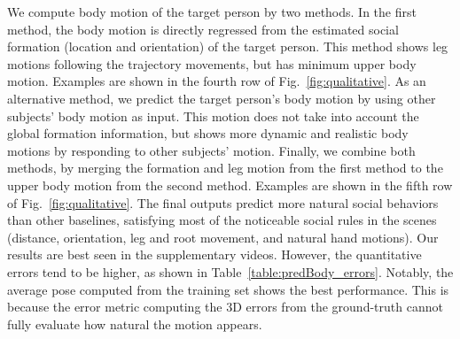 We compute body motion of the target person by two methods. In the first method, the body motion is directly regressed from the estimated social formation (location and orientation) of the target person. This method shows leg motions following the trajectory movements, but has minimum upper body motion. Examples are shown in the fourth row of Fig.~\ref{fig:qualitative}. As an alternative method, we predict the target person's body motion by using other subjects' body motion as input. This motion does not take into account the global formation information, but shows more dynamic and realistic body motions by responding to other subjects' motion. Finally, we combine both methods, by merging the formation and leg motion from the first method to the upper body motion from the second method. Examples are shown in the fifth row of Fig.~\ref{fig:qualitative}. The final outputs predict more natural social behaviors than other baselines, satisfying most of the noticeable social rules in the scenes (distance, orientation, leg and root movement, and natural hand motions). Our results are best seen in the supplementary videos. However, the quantitative errors tend to be higher, as shown in Table~\ref{table:predBody_errors}. Notably, the average pose computed from the training set shows the best performance. This is because the error metric computing the 3D errors from the ground-truth cannot fully evaluate how natural the motion appears. %












